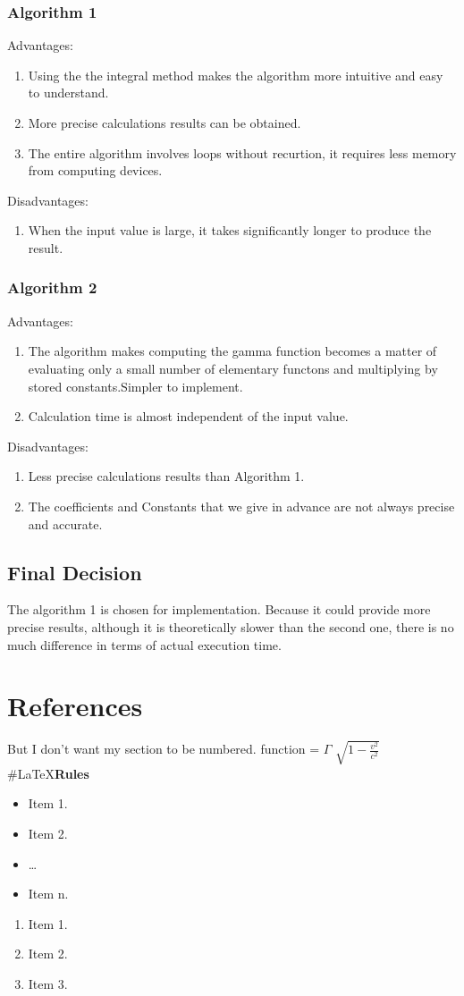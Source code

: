 \documentclass{report}
\begin{document}
\subsubsection{Algorithm 1}
Advantages:
\begin{enumerate}
\item Using the the integral method makes the algorithm more intuitive and easy to understand.
\item More precise calculations results can be obtained.
\item The entire algorithm involves loops without recurtion, it requires less memory from computing devices.
\end{enumerate}
Disadvantages:
\begin{enumerate}
\item When the input value is large, it takes significantly longer to produce the result.
\end{enumerate}

\subsubsection{Algorithm 2}
Advantages:
\begin{enumerate}
\item The algorithm makes computing the gamma function becomes a matter of evaluating only a small number of elementary functons and multiplying by stored constants.Simpler to implement.
\item Calculation time is almost independent of the input value.
\end{enumerate}
Disadvantages:
\begin{enumerate}
\item Less precise calculations results than Algorithm 1.
\item The coefficients and Constants that we give in advance are not always precise and accurate.
\end{enumerate}
\subsection{Final Decision}
The algorithm 1 is chosen for implementation. Because it could provide more precise results, although it is theoretically slower than the second one, there is no much difference in terms of actual execution time.
\section{References}
But I don't want my section to be numbered. 
function = $\Gamma$
$\sqrt{1-\frac{v^2}{c^2}}$
\#\LaTeX\textbf{Rules}\!
\begin{itemize}
\item Item 1.
\item Item 2.
\item \ldots
\item Item n.
\end{itemize}
\begin{enumerate}
\item Item 1.
\item Item 2.
\item Item 3.
\end{enumerate}
\end{document}
